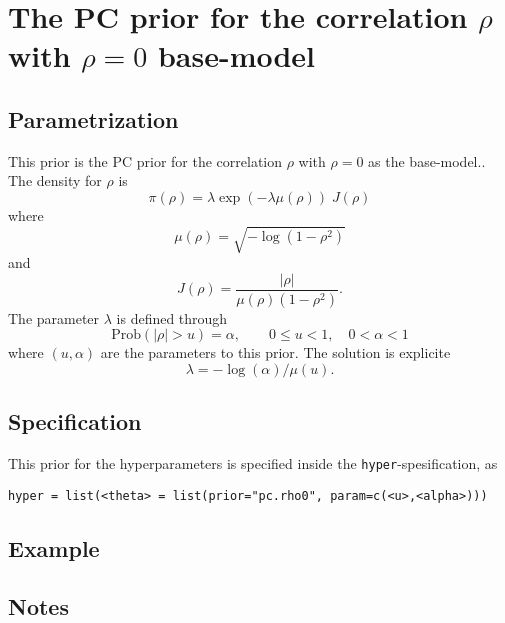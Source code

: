 \documentclass[a4paper,11pt]{article}
\begin{document}
\section*{The PC prior for the correlation $\rho$ with $\rho=0$ base-model}

\subsection*{Parametrization}
This prior is the PC prior for the correlation $\rho$ with $\rho=0$ as
the base-model.. The density for $\rho$ is
\begin{displaymath}
    \pi(\rho) = \lambda \exp(-\lambda \mu(\rho)) \; J(\rho)
\end{displaymath}
where
\begin{displaymath}
    \mu(\rho) = \sqrt{-\log(1-\rho^{2})}
\end{displaymath}
and
\begin{displaymath}
    J(\rho) = \frac{|\rho|}{\mu(\rho) (1-\rho^{2})}.
\end{displaymath}
The parameter $\lambda$ is defined through
\begin{displaymath}
    \text{Prob}( |\rho| > u) = \alpha, \qquad 0 \le u < 1, \quad 0<\alpha<1
\end{displaymath}
where $(u, \alpha{})$ are the parameters to this prior. The solution
is explicite 
\begin{displaymath}
    \lambda = -\log(\alpha)/\mu(u).
\end{displaymath}

\subsection*{Specification}
This prior for the hyperparameters is specified inside the
\texttt{hyper}-spesification, as
\begin{center}
    \texttt{hyper = list(<theta> = list(prior="pc.rho0", param=c(<u>,<alpha>)))}
\end{center}

\subsection*{Example}

\subsection*{Notes}
\end{document}
